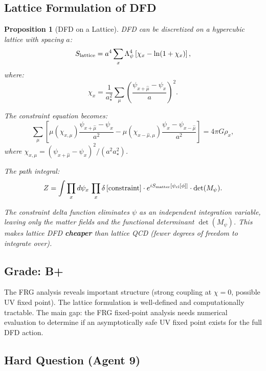 \documentclass[11pt,a4paper]{article}
\newtheorem{proposition}{Proposition}
\begin{document}
\subsection{Lattice Formulation of DFD}

\begin{proposition}[DFD on a Lattice]
\label{prop:lattice}
DFD can be discretized on a hypercubic lattice with spacing $a$:
\begin{equation}
S_{\rm lattice} = a^4\sum_x \Lambda_\psi^4\left[\chi_x - \ln(1+\chi_x)\right],
\end{equation}
where:
\begin{equation}
\chi_x = \frac{1}{a_\star^2}\sum_{\mu}\left(\frac{\psi_{x+\hat\mu} - \psi_x}{a}\right)^2.
\end{equation}

The constraint equation becomes:
\begin{equation}
\sum_\mu\left[\mu(\chi_{x,\mu})\frac{\psi_{x+\hat\mu} - \psi_x}{a^2} - \mu(\chi_{x-\hat\mu,\mu})\frac{\psi_x - \psi_{x-\hat\mu}}{a^2}\right] = 4\pi G\rho_x,
\end{equation}
where $\chi_{x,\mu} = (\psi_{x+\hat\mu}-\psi_x)^2/(a^2 a_\star^2)$.

The path integral:
\begin{equation}
Z = \int\prod_x d\psi_x\,\prod_x\delta\left[\text{constraint}\right]\cdot e^{iS_{\rm matter}[\psi_{\rm cl}[\phi]]}\cdot\det(M_\psi).
\end{equation}

The constraint delta function eliminates $\psi$ as an independent integration variable, leaving only the matter fields and the functional determinant $\det(M_\psi)$. This makes lattice DFD \textbf{cheaper} than lattice QCD (fewer degrees of freedom to integrate over).
\end{proposition}

\subsection{Grade: B+}

The FRG analysis reveals important structure (strong coupling at $\chi = 0$, possible UV fixed point). The lattice formulation is well-defined and computationally tractable. The main gap: the FRG fixed-point analysis needs numerical evaluation to determine if an asymptotically safe UV fixed point exists for the full DFD action.

\subsection{Hard Question (Agent 9)}
\end{document}
